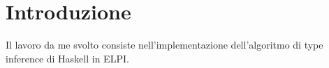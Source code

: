 \documentclass[12pt,a4paper,openright,twoside]{report}
\begin{document}


\tableofcontents	%

\rhead[\fancyplain{}{\bfseries\leftmark}]{\fancyplain{}{\bfseries\thepage}}

\clearpage{\pagestyle{empty}\cleardoublepage}	%








\chapter{Introduzione}		%


Il lavoro da me svolto consiste nell'implementazione dell'algoritmo di type inference di Haskell in ELPI.\\
\end{document}
